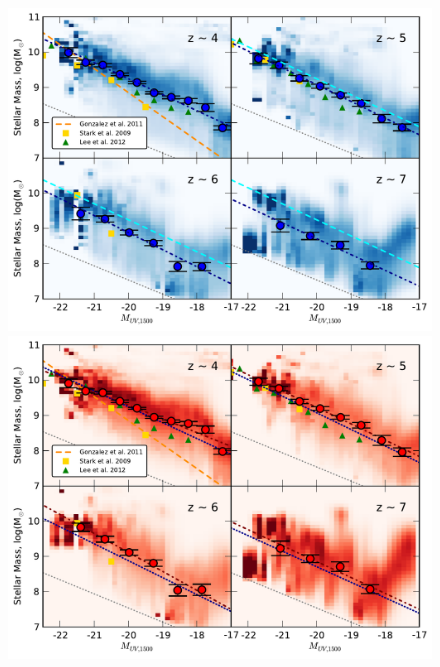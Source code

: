 \begin{figure}
\includegraphics[width=130mm]{plots/fig8a.pdf}
\includegraphics[width=130mm]{plots/fig8b.pdf}

\end{figure}
